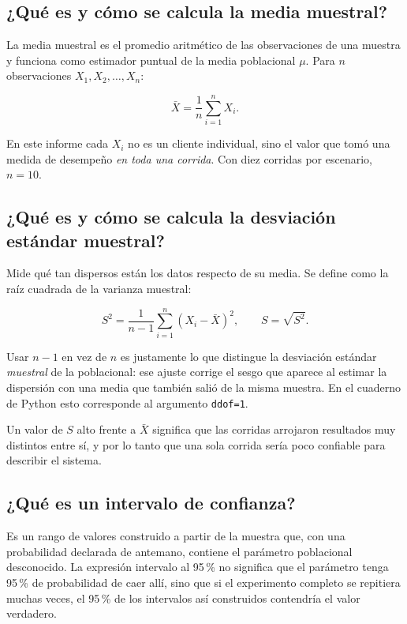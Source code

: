 \documentclass[11pt,letterpaper]{article}
\begin{document}
\subsection{¿Qué es y cómo se calcula la media muestral?}

La media muestral es el promedio aritmético de las observaciones de una muestra y funciona como estimador puntual de la media poblacional $\mu$. Para $n$ observaciones $X_1, X_2, \dots, X_n$:

\[
\bar{X} = \frac{1}{n}\sum_{i=1}^{n} X_i .
\]

En este informe cada $X_i$ no es un cliente individual, sino el valor que tomó una medida de desempeño \emph{en toda una corrida}. Con diez corridas por escenario, $n = 10$.

\subsection{¿Qué es y cómo se calcula la desviación estándar muestral?}

Mide qué tan dispersos están los datos respecto de su media. Se define como la raíz cuadrada de la varianza muestral:

\[
S^2 = \frac{1}{n-1}\sum_{i=1}^{n}\left(X_i - \bar{X}\right)^2, \qquad S = \sqrt{S^2}.
\]

Usar $n-1$ en vez de $n$ es justamente lo que distingue la desviación estándar \emph{muestral} de la poblacional: ese ajuste corrige el sesgo que aparece al estimar la dispersión con una media que también salió de la misma muestra. En el cuaderno de Python esto corresponde al argumento \texttt{ddof=1}.

Un valor de $S$ alto frente a $\bar{X}$ significa que las corridas arrojaron resultados muy distintos entre sí, y por lo tanto que una sola corrida sería poco confiable para describir el sistema.

\subsection{¿Qué es un intervalo de confianza?}

Es un rango de valores construido a partir de la muestra que, con una probabilidad declarada de antemano, contiene el parámetro poblacional desconocido. La expresión \guillemotleft intervalo al 95\,\%\guillemotright{} no significa que el parámetro tenga 95\,\% de probabilidad de caer allí, sino que si el experimento completo se repitiera muchas veces, el 95\,\% de los intervalos así construidos contendría el valor verdadero.
\end{document}
